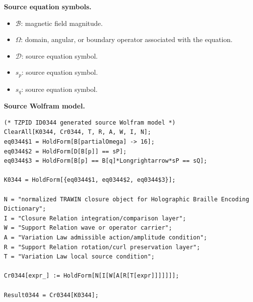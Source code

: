 \begin{minipage}[t]{0.49\linewidth}
\begingroup
\small
\raggedright
\textbf{Source equation symbols.}\par
\begin{itemize}[leftmargin=1.35em,itemsep=1pt,topsep=1pt,parsep=0pt]
    \item $\mathcal{B}$: magnetic field magnitude.
    \item $\Omega$: domain, angular, or boundary operator associated with the equation.
    \item $\mathcal{D}$: source equation symbol.
    \item $s_{p}$: source equation symbol.
    \item $s_{q}$: source equation symbol.
\end{itemize}
\endgroup
\end{minipage}\hfill
\begin{minipage}[t]{0.47\linewidth}
\begingroup
\scriptsize
\raggedright
\textbf{Source Wolfram model.}\par
\begin{Verbatim}[fontsize=\tiny,breaklines=true,breakanywhere=true]
(* TZPID ID0344 generated source Wolfram model *)
ClearAll[K0344, Cr0344, T, R, A, W, I, N];
eq0344$1 = HoldForm[B[partialOmega] -> 16];
eq0344$2 = HoldForm[D[B[p]] == sP];
eq0344$3 = HoldForm[B[p] == B[q]*Longrightarrow*sP == sQ];

K0344 = HoldForm[{eq0344$1, eq0344$2, eq0344$3}];

N = "normalized TRAWIN closure object for Holographic Braille Encoding Dictionary";
I = "Closure Relation integration/comparison layer";
W = "Support Relation wave or operator carrier";
A = "Variation Law admissible action/amplitude condition";
R = "Support Relation rotation/curl preservation layer";
T = "Variation Law local source condition";

Cr0344[expr_] := HoldForm[N[I[W[A[R[T[expr]]]]]]];

Result0344 = Cr0344[K0344];
\end{Verbatim}
\endgroup
\end{minipage}

